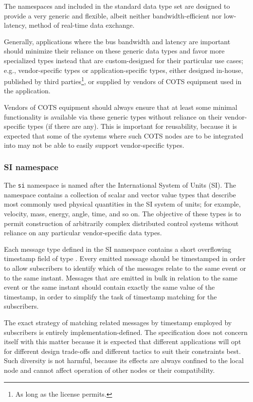 The namespaces  and 
included in the standard data type set are designed to provide a very generic and flexible,
albeit neither bandwidth-efficient nor low-latency, method of real-time data exchange.

Generally, applications where the bus bandwidth and latency are important should minimize their reliance
on these generic data types and favor more specialized types instead that are custom-designed for their
particular use cases; e.g., vendor-specific types or application-specific types, either
designed in-house, published by third parties\footnote{As long as the license permits.}, or supplied by
vendors of COTS equipment used in the application.

Vendors of COTS equipment should always ensure that at least some minimal functionality is available
via these generic types without reliance on their vendor-specific types (if there are any).
This is important for reusability, because it is expected that some of the systems where such COTS nodes are
to be integrated into may not be able to easily support vendor-specific types.

\subsubsection{SI namespace}

The \verb|si| namespace is named after the International System of Units (SI).
The namespace contains a collection of scalar and vector value types that describe most commonly used
physical quantities in the SI system of units; for example, velocity, mass, energy, angle, time, and so on.
The objective of these types is to permit construction of arbitrarily complex distributed control systems without
reliance on any particular vendor-specific data types.

Each message type defined in the SI namespace contains a short overflowing timestamp field of type
.
Every emitted message should be timestamped in order to allow subscribers to identify which of the messages
relate to the same event or to the same instant.
Messages that are emitted in bulk in relation to the same event or the same instant should contain
exactly the same value of the timestamp,
in order to simplify the task of timestamp matching for the subscribers.

The exact strategy of matching related messages by timestamp employed by subscribers is entirely
implementation-defined.
The specification does not concern itself with this matter because it is expected that different applications
will opt for different design trade-offs and different tactics to suit their constraints best.
Such diversity is not harmful, because its effects are always confined to the local node and cannot affect
operation of other nodes or their compatibility.

